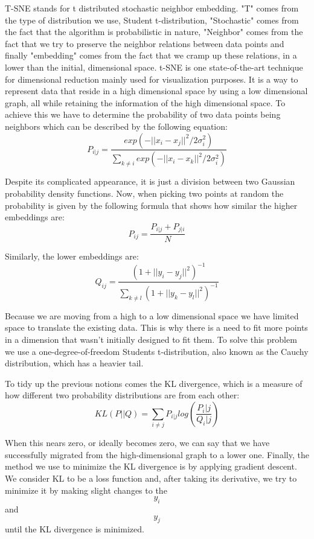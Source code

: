 T-SNE stands for t distributed stochastic neighbor embedding. "T" comes from the type of distribution we use,
Student t-distribution, "Stochastic" comes from the fact that the algorithm is probabilistic in nature, "Neighbor"
comes from the fact that we try to preserve the neighbor relations between data points and finally "embedding"
comes from the fact that we cramp up these relations, in a lower than the initial, dimensional space. t-SNE
is one state-of-the-art technique for dimensional reduction mainly used for visualization purposes. It is a 
way to represent data that reside in a high dimensional space by using a low dimensional graph, all while 
retaining the information of the high dimensional space. To achieve this we have to determine the probability
of two data points being neighbors which can be described by the following equation:
$$P_{i|j} = \frac{exp(-||x_i - x_j||^2 / 2\sigma_i^2)}{\sum_{k \neq i} exp(-||x_i - x_k||^2 / 2\sigma_i^2)}$$

Despite its complicated appearance, it is just a division between two Gaussian probability density functions.
Now, when picking two points at random the probability is given by the following formula that shows how similar
the higher embeddings are:
$$P_{ij} = \frac{P_{i|j} + P_{j|i}}{N}$$

Similarly, the lower embeddings are: 
$$Q_{ij} = \frac{(1 + ||y_i - y_j||^2)^{-1}}{\sum_{k \neq l} (1 + ||y_k - y_l||^2)^{-1}}$$

Because we are moving from a high to a low dimensional space we have limited space to translate the existing
data. This is why there is a need to fit more points in a dimension that wasn't initially designed to fit them.
To solve this problem we use a one-degree-of-freedom Students t-distribution, also known as the Cauchy 
distribution, which has a heavier tail.

To tidy up the previous notions comes the KL divergence, which is a measure of how different two probability
distributions are from each other:
$$KL(P||Q) = \sum_{i \neq j} P_{i|j} log\left(\frac{P_i|j}{Q_i|j}\right)$$

When this nears zero, or ideally becomes zero, we can say that we have successfully migrated from the 
high-dimensional graph to a lower one. Finally, the method we use to minimize the KL divergence is by
applying gradient descent. We consider KL to be a loss function and, after taking its derivative, we
try to minimize it by making slight changes to the $$y_i$$ and $$y_j$$ until the KL divergence is minimized.